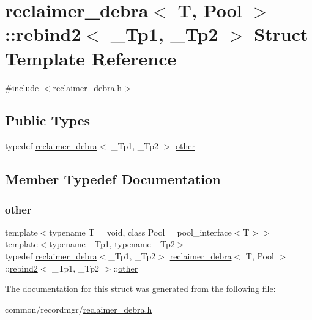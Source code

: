 \hypertarget{structreclaimer__debra_1_1rebind2}{}\section{reclaimer\+\_\+debra$<$ T, Pool $>$\+:\+:rebind2$<$ \+\_\+\+Tp1, \+\_\+\+Tp2 $>$ Struct Template Reference}
\label{structreclaimer__debra_1_1rebind2}


{\ttfamily \#include $<$reclaimer\+\_\+debra.\+h$>$}

\subsection*{Public Types}
\begin{DoxyCompactItemize}
\item 
typedef \hyperlink{classreclaimer__debra}{reclaimer\+\_\+debra}$<$ \+\_\+\+Tp1, \+\_\+\+Tp2 $>$ \hyperlink{structreclaimer__debra_1_1rebind2_a92b51b892463cd6c1699bcebce761994}{other}
\end{DoxyCompactItemize}


\subsection{Member Typedef Documentation}
\mbox{\label{structreclaimer__debra_1_1rebind2_a92b51b892463cd6c1699bcebce761994}} 
\subsubsection{\texorpdfstring{other}{other}}
{\footnotesize\ttfamily template$<$typename T  = void, class Pool  = pool\+\_\+interface$<$\+T$>$$>$ \\
template$<$typename \+\_\+\+Tp1, typename \+\_\+\+Tp2$>$ \\
typedef \hyperlink{classreclaimer__debra}{reclaimer\+\_\+debra}$<$\+\_\+\+Tp1, \+\_\+\+Tp2$>$ \hyperlink{classreclaimer__debra}{reclaimer\+\_\+debra}$<$ T, Pool $>$\+::\hyperlink{structreclaimer__debra_1_1rebind2}{rebind2}$<$ \+\_\+\+Tp1, \+\_\+\+Tp2 $>$\+::\hyperlink{structreclaimer__debra_1_1rebind2_a92b51b892463cd6c1699bcebce761994}{other}}



The documentation for this struct was generated from the following file\+:\begin{DoxyCompactItemize}
\item 
common/recordmgr/\hyperlink{reclaimer__debra_8h}{reclaimer\+\_\+debra.\+h}\end{DoxyCompactItemize}
